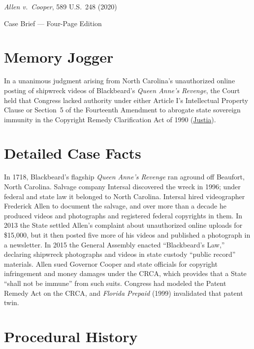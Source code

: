 \documentclass[12pt]{article}
\begin{document}
\begin{center}
{\LARGE \textit{Allen v.\ Cooper}, 589 U.S.\ 248 (2020)\par}
\vspace{0.8em}
{\large Case Brief --- Four-Page Edition\par}
\end{center}
\vspace{1em}

\section{Memory Jogger}

In a unanimous judgment arising from North Carolina's unauthorized online posting of shipwreck videos of Blackbeard's \textit{Queen Anne's Revenge}, the Court held that Congress lacked authority under either Article I's Intellectual Property Clause or Section~5 of the Fourteenth Amendment to abrogate state sovereign immunity in the Copyright Remedy Clarification Act of 1990 (\href{https://supreme.justia.com/cases/federal/us/589/18-877/}{Justia}).

\section{Detailed Case Facts}

In 1718, Blackbeard's flagship \textit{Queen Anne's Revenge} ran aground off Beaufort, North Carolina. Salvage company Intersal discovered the wreck in 1996; under federal and state law it belonged to North Carolina. Intersal hired videographer Frederick Allen to document the salvage, and over more than a decade he produced videos and photographs and registered federal copyrights in them. In 2013 the State settled Allen's complaint about unauthorized online uploads for \$15,000, but it then posted five more of his videos and published a photograph in a newsletter. In 2015 the General Assembly enacted ``Blackbeard's Law,'' declaring shipwreck photographs and videos in state custody ``public record'' materials. Allen sued Governor Cooper and state officials for copyright infringement and money damages under the CRCA, which provides that a State ``shall not be immune'' from such suits. Congress had modeled the Patent Remedy Act on the CRCA, and \textit{Florida Prepaid} (1999) invalidated that patent twin.

\section{Procedural History}
\end{document}
